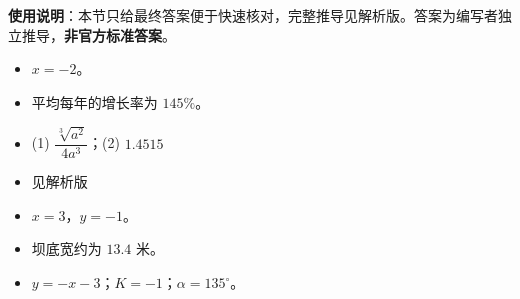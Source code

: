 
\begin{gknotice}
\textbf{使用说明}：本节只给最终答案便于快速核对，完整推导见解析版。答案为编写者独立推导，\textbf{非官方标准答案}。
\end{gknotice}

\begin{itemize}[leftmargin=2.6em]
  \item[\textbf{1.}] $x=-2$。
  \item[\textbf{2.}] 平均每年的增长率为 $145\%$。
  \item[\textbf{3.}] (1) $\dfrac{\sqrt[3]{a^2}}{4a^3}$；(2) $1.4515$
  \item[\textbf{4.}] 见解析版
  \item[\textbf{5.}] $x=3$，$y=-1$。
  \item[\textbf{6.}] 坝底宽约为 $13.4$ 米。
  \item[\textbf{7.}] $y=-x-3$；$K=-1$；$\alpha=135^\circ$。
\end{itemize}
